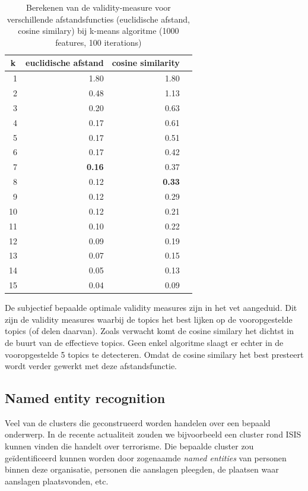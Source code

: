 \begin{table}[htbp]
  \centering
  \caption{Berekenen van de validity-measure voor verschillende afstandsfuncties (euclidische afstand, cosine similary) bij k-means algoritme (1000 features, 100 iterations)}
    \begin{tabular}{rrrr}
    \toprule
    \multicolumn{1}{c}{k} & euclidische afstand & cosine similarity \\
    \midrule
    1     & 1.80  & 1.80  \\
    2     & 0.48   & 1.13 \\
    3     & 0.20  & 0.63  \\
    4     & 0.17   & 0.61   \\
    5     & 0.17  & 0.51  \\
    6     & 0.17  & 0.42   \\
    7     & \textbf{0.16}  & 0.37  \\
    8     & 0.12  & \textbf{0.33}  \\
    9     & 0.12  & 0.29  \\
    10    & 0.12  & 0.21   \\
    11    & 0.10  & 0.22  \\
    12    & 0.09  & 0.19   \\
    13    & 0.07  & 0.15   \\
    14    & 0.05  & 0.13    \\
    15    & 0.04  & 0.09   \\
    \bottomrule
    \end{tabular}%
  \label{tab:clusters-validity}%
\end{table}%

De subjectief bepaalde optimale validity measures zijn in het vet aangeduid. Dit zijn de validity measures waarbij de topics het best lijken op de vooropgestelde topics (of delen daarvan). Zoals verwacht komt de cosine similary het dichtst in de buurt van de effectieve topics. Geen enkel algoritme slaagt er echter in de vooropgestelde 5 topics te detecteren. Omdat de cosine similary het best presteert wordt verder gewerkt met deze afstandsfunctie.

\subsection{Named entity recognition}
Veel van de clusters die geconstrueerd worden handelen over een bepaald onderwerp. In de recente actualiteit zouden we bijvoorbeeld een cluster rond ISIS kunnen vinden die handelt over terrorisme. Die bepaalde cluster zou ge\"identificeerd kunnen worden door zogenaamde \textit{named entities} van personen binnen deze organisatie, personen die aanslagen pleegden, de plaatsen waar aanslagen plaatsvonden, etc.


